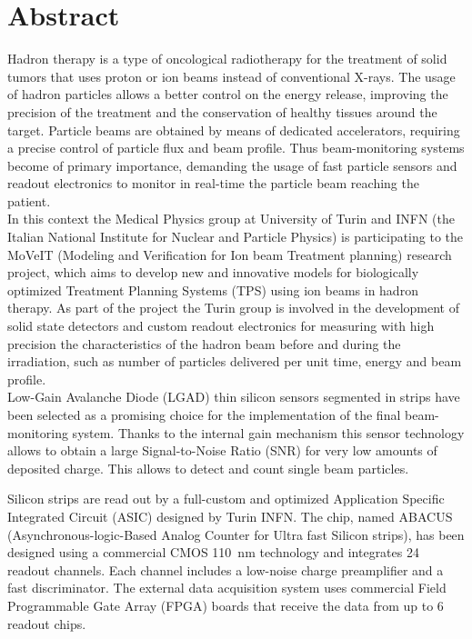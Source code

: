 
\chapter*{Abstract}
\thispagestyle{plain}
Hadron therapy is a type of oncological radiotherapy for the treatment of solid tumors that uses proton or
ion beams instead of conventional X-rays. The usage of hadron particles allows a better control on the energy release,
improving the precision of the treatment and the conservation of healthy tissues around the target.
Particle beams are obtained by means of dedicated accelerators, requiring a precise control of particle flux and beam profile.
Thus beam-monitoring systems become of primary importance, demanding the usage of fast particle sensors and readout electronics to monitor
in real-time the particle beam reaching the patient.\\

\noindent In this context the Medical Physics group at University of Turin and INFN (the Italian National Institute for
Nuclear and Particle Physics) is participating to the MoVeIT (Modeling and Verification for Ion beam Treatment planning) research project, which aims to develop new and
innovative models for biologically optimized Treatment Planning Systems (TPS) using ion beams in hadron therapy.
As part of the project the Turin group is involved in the development of solid state detectors and custom readout electronics for measuring with high precision
the characteristics of the hadron beam before and during the irradiation, such as number of particles delivered per unit time, energy and beam profile.\\

\noindent Low-Gain Avalanche Diode (LGAD) thin silicon sensors segmented in strips have been selected as a promising choice for the implementation
of the final beam-monitoring system. Thanks to the internal gain mechanism this sensor technology allows to obtain a large
Signal-to-Noise Ratio (SNR) for very low amounts of deposited charge. This allows to detect and count single beam particles.

\noindent Silicon strips are read out by a full-custom and optimized Application Specific Integrated Circuit (ASIC) designed by Turin INFN.
The chip, named ABACUS (Asynchronous-logic-Based Analog Counter for Ultra fast Silicon strips), has been 
designed using a commercial CMOS 110~nm technology and integrates 24 readout channels. Each channel includes a low-noise charge preamplifier 
and a fast discriminator. The external data acquisition system uses commercial Field Programmable Gate Array (FPGA) boards that receive
the data from up to 6 readout chips.\\%

